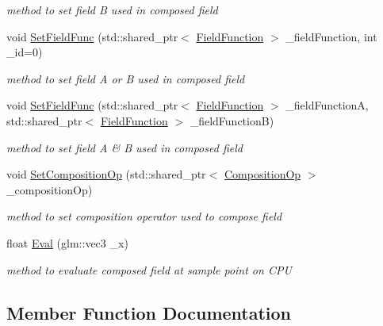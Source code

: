 \begin{DoxyCompactItemize}
\begin{DoxyCompactList}\small\item\em method to set field B used in composed field \end{DoxyCompactList}\item 
void \hyperlink{classComposedField_acc1c3b0394bbef687d98af2ac599baaa}{Set\+Field\+Func} (std\+::shared\+\_\+ptr$<$ \hyperlink{classFieldFunction}{Field\+Function} $>$ \+\_\+field\+Function, int \+\_\+id=0)\hypertarget{classComposedField_acc1c3b0394bbef687d98af2ac599baaa}{}\label{classComposedField_acc1c3b0394bbef687d98af2ac599baaa}

\begin{DoxyCompactList}\small\item\em method to set field A or B used in composed field \end{DoxyCompactList}\item 
void \hyperlink{classComposedField_a886f23c15fb922593166f96205434b65}{Set\+Field\+Func} (std\+::shared\+\_\+ptr$<$ \hyperlink{classFieldFunction}{Field\+Function} $>$ \+\_\+field\+FunctionA, std\+::shared\+\_\+ptr$<$ \hyperlink{classFieldFunction}{Field\+Function} $>$ \+\_\+field\+FunctionB)\hypertarget{classComposedField_a886f23c15fb922593166f96205434b65}{}\label{classComposedField_a886f23c15fb922593166f96205434b65}

\begin{DoxyCompactList}\small\item\em method to set field A \& B used in composed field \end{DoxyCompactList}\item 
void \hyperlink{classComposedField_a36da55ccfcb30aff5b4c61612a2f2a7a}{Set\+Composition\+Op} (std\+::shared\+\_\+ptr$<$ \hyperlink{classCompositionOp}{Composition\+Op} $>$ \+\_\+composition\+Op)
\begin{DoxyCompactList}\small\item\em method to set composition operator used to compose field \end{DoxyCompactList}\item 
float \hyperlink{classComposedField_af86aa0b8541b7c40116bd71850201903}{Eval} (glm\+::vec3 \+\_\+x)
\begin{DoxyCompactList}\small\item\em method to evaluate composed field at sample point on C\+PU \end{DoxyCompactList}\end{DoxyCompactItemize}


\subsection{Member Function Documentation}
